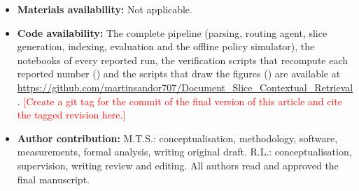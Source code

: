 \documentclass[pdflatex,sn-mathphys-num]{sn-jnl}
\newcommand{\todo}[1]{\textcolor{red}{#1}}
\theoremstyle{thmstyleone}%
\theoremstyle{thmstylethree}%
\begin{document}
\begin{itemize}
\item \textbf{Materials availability:} Not applicable.
\item \textbf{Code availability:} The complete pipeline (parsing, routing agent, slice generation, indexing, evaluation and the offline policy simulator), the notebooks of every reported run, the verification scripts that recompute each reported number () and the scripts that draw the figures () are available at \url{https://github.com/martinsandor707/Document_Slice_Contextual_Retrieval}. \todo{[Create a git tag for the commit of the final version of this article and cite the tagged revision here.]}
\item \textbf{Author contribution:}  M.T.S.: conceptualisation, methodology, software, measurements, formal analysis, writing original draft. R.L.: conceptualisation, supervision, writing review and editing. All authors read and approved the final manuscript.
\end{itemize}


\end{document}
